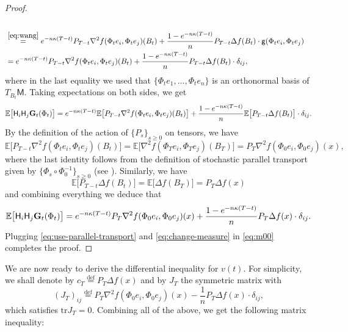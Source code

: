 \documentclass[a4paper,twoside,11pt,reqno]{amsart}
\newcommand{\eqdef}{\stackrel{\mathrm{def}}{=}}
\newcommand{\li}{\bf }
\newcommand{\MM}{\mathsf{M}}
\newcommand{\GG}{\mathsf{g}}
\newcommand{\mb}{\mathbb}
\newcommand{\mr}{\mathrm}
\newcommand{\HH}{\mathsf{H}}
\begin{document}
\begin{proof}
\begin{equation}
\begin{split}
\\ & \stackrel{\eqref{eq:wang}}{=} e^{-n\kappa(T-t)} P_{T-t}\nabla^2 f(\Phi_te_i, \Phi_te_j)(B_t) + \frac{1-e^{-n\kappa(T-t)}}{n} P_{T-t}\Delta f(B_t) \cdot \GG(\Phi_t e_i, \Phi_t e_j)
\\ & = e^{-n\kappa(T-t)} P_{T-t}\nabla^2 f(\Phi_te_i, \Phi_te_j)(B_t) + \frac{1-e^{-n\kappa(T-t)}}{n} P_{T-t}\Delta f(B_t) \cdot \delta_{ij},
\end{split}
\end{equation}
where in the last equality we used that $\{\Phi_te_1,\ldots,\Phi_te_n\}$ is an orthonormal basis of $T_{B_t}\MM$. Taking expectations on both sides, we get
\begin{equation}
\mb{E}\big[\HH_i\HH_j {\li G}_t (\Phi_t)  \big]  = e^{-n\kappa(T-t)} \mb{E}\big[ P_{T-t}\nabla^2 f(\Phi_te_i, \Phi_te_j)(B_t)  \big] + \frac{1-e^{-n\kappa(T-t)}}{n} \mb{E}\big[P_{T-t}\Delta f(B_t) \big]\cdot \delta_{ij}.
\end{equation}
By the definition \cite[Equation~(1.2)]{Wan19} of the action of $\{P_s\}_{s\geq0}$ on tensors, we have
\begin{equation*}
 \mb{E}\big[ P_{T-t}\nabla^2 f(\Phi_te_i, \Phi_te_j)(B_t)  \big]  =  \mb{E}\big[ \nabla^2 f(\Phi_Te_i, \Phi_Te_j)(B_T)  \big] = P_T \nabla^2 f(\Phi_0e_i, \Phi_0e_j)(x),
\end{equation*}
where the last identity follows from the definition of stochastic parallel transport given by $\{\Phi_s\circ\Phi_0^{-1}\}_{s\geq0}$ (see \cite[Section~2.3]{Hsu02}). Similarly, we have
\begin{equation}
\mb{E}\big[P_{T-t}\Delta f(B_t) \big] = \mb{E} \big[ \Delta f(B_T)\big] = P_T\Delta f(x)
\end{equation}
and combining everything we deduce that
\begin{equation} \label{eq:use-parallel-transport}
\mb{E}\big[\HH_i\HH_j {\li G}_t (\Phi_t)  \big]  = e^{-n\kappa(T-t)} P_T \nabla^2 f(\Phi_0e_i, \Phi_0e_j)(x) + \frac{1-e^{-n\kappa(T-t)}}{n} P_T\Delta f(x)\cdot \delta_{ij}.
\end{equation}
Plugging \eqref{eq:use-parallel-transport} and \eqref{eq:change-measure} in \eqref{eq:m00} completes the proof.
\end{proof}

We are now ready to derive the differential inequality for $v(t)$. For simplicity, we shall denote by $c_T \eqdef  P_T\Delta f(x)$ and by $J_T$ the symmetric matrix with
\begin{equation}
\label{eq:J_T}
(J_T)_{ij} \eqdef P_T\nabla^2 f(\Phi_0 e_i, \Phi_0 e_j)(x) - \frac{1}{n} P_T \Delta f(x)\cdot \delta_{ij},
\end{equation}
which satisfies $\mr{tr} J_T=0$. Combining all of the above, we get the following matrix inequality:
\end{document}
